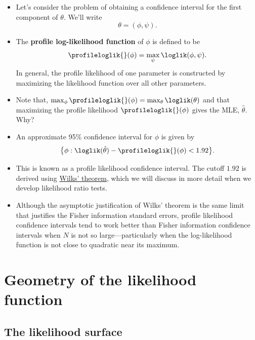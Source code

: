 \documentclass[
  letterpaper,
  DIV=11,
  numbers=noendperiod]{scrartcl}
\providecommand{\tightlist}{%
  \setlength{\itemsep}{0pt}\setlength{\parskip}{0pt}}\usepackage{longtable,booktabs,array}
\begin{document}
\begin{itemize}
\tightlist
\item
  Let's consider the problem of obtaining a confidence interval for the
  first component of \(\theta\). We'll write \[\theta=(\phi,\psi).\]
\item
  The \textbf{profile log-likelihood function} of \(\phi\) is defined to
  be \begin{equation*}
    \profileloglik{{}}(\phi) = \max_{\psi}\loglik(\phi,\psi).
  \end{equation*} In general, the profile likelihood of one parameter is
  constructed by maximizing the likelihood function over all other
  parameters.
\item
  Note that,
  \(\max_{\phi}\profileloglik{{}}(\phi) = \max_{\theta}\loglik(\theta)\)
  and that maximizing the profile likelihood
  \(\profileloglik{{}}(\phi)\) gives the MLE, \(\hat{\theta}\). Why?
\item
  An approximate 95\% confidence interval for \(\phi\) is given by
  \begin{equation*}
    \big\{\phi : \loglik(\hat\theta) - \profileloglik{{}}(\phi) < 1.92\big\}.
  \end{equation*}
\item
  This is known as a profile likelihood confidence interval. The cutoff
  \(1.92\) is derived using
  \href{https://en.wikipedia.org/wiki/Likelihood-ratio_test\#Distribution:_Wilks.27s_theorem}{Wilks'
  theorem}, which we will discuss in more detail when we develop
  likelihood ratio tests.
\item
  Although the asymptotic justification of Wilks' theorem is the same
  limit that justifies the Fisher information standard errors, profile
  likelihood confidence intervals tend to work better than Fisher
  information confidence intervals when \(N\) is not so
  large---particularly when the log-likelihood function is not close to
  quadratic near its maximum.
\end{itemize}

\hypertarget{geometry-of-the-likelihood-function}{%
\section{Geometry of the likelihood
function}\label{geometry-of-the-likelihood-function}}

\hypertarget{the-likelihood-surface}{%
\subsection{The likelihood surface}\label{the-likelihood-surface}}
\end{document}
